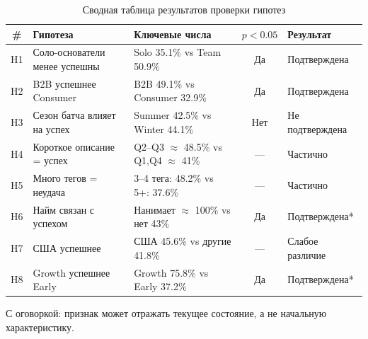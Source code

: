 \begin{table}[htbp]
\centering
\small
\caption{Сводная таблица результатов проверки гипотез}
\label{tab:hypotheses}
\begin{tabular}{@{}c p{4.5cm} p{3.5cm} c p{2.5cm}@{}}
\toprule
\textbf{\#} & \textbf{Гипотеза} & \textbf{Ключевые числа} & \textbf{$p < 0.05$} & \textbf{Результат} \\
\midrule
H1 & Соло-основатели менее успешны & Solo 35.1\% vs Team 50.9\% & Да & Подтверждена \\
\addlinespace[2pt]
H2 & B2B успешнее Consumer & B2B 49.1\% vs Consumer 32.9\% & Да & Подтверждена \\
\addlinespace[2pt]
H3 & Сезон батча влияет на успех & Summer 42.5\% vs Winter 44.1\% & Нет & Не подтверждена \\
\addlinespace[2pt]
H4 & Короткое описание = успех & Q2--Q3 $\approx$ 48.5\% vs Q1,Q4 $\approx$ 41\% & --- & Частично \\
\addlinespace[2pt]
H5 & Много тегов = неудача & 3--4 тега: 48.2\% vs 5+: 37.6\% & --- & Частично \\
\addlinespace[2pt]
H6 & Найм связан с успехом & Нанимает $\approx$ 100\% vs нет 43\% & Да & Подтверждена* \\
\addlinespace[2pt]
H7 & США успешнее & США 45.6\% vs другие 41.8\% & --- & Слабое различие \\
\addlinespace[2pt]
H8 & Growth успешнее Early & Growth 75.8\% vs Early 37.2\% & Да & Подтверждена* \\
\bottomrule
\end{tabular}

\vspace{4pt}
\raggedright\footnotesize * С оговоркой: признак может отражать текущее состояние, а не начальную характеристику.
\end{table}
